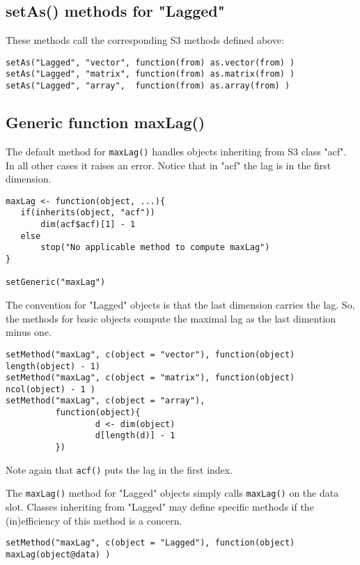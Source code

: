 \documentclass[11pt,a4paper]{article}
\begin{document}
\subsection{setAs() methods for "Lagged"}
\label{sec:orgd96946a}

These methods call the corresponding S3 methods defined above:
\begin{verbatim}
setAs("Lagged", "vector", function(from) as.vector(from) )
setAs("Lagged", "matrix", function(from) as.matrix(from) )
setAs("Lagged", "array",  function(from) as.array(from) )
\end{verbatim}



\subsection{Generic function maxLag()}
\label{sec:org888f20a}

The default method for \texttt{maxLag()} handles objects inheriting from S3 class "acf". In all
other cases it raises an error. Notice that in "acf" the lag is in the first dimension.
\begin{verbatim}
maxLag <- function(object, ...){
   if(inherits(object, "acf"))
       dim(acf$acf)[1] - 1
   else
       stop("No applicable method to compute maxLag")
}

setGeneric("maxLag")
\end{verbatim}

The convention for "Lagged" objects is that the last dimension carries the lag.  So, the
methods for basic objects compute the maximal lag as the last dimention minus one.
\begin{verbatim}
setMethod("maxLag", c(object = "vector"), function(object) length(object) - 1)
setMethod("maxLag", c(object = "matrix"), function(object) ncol(object) - 1 )
setMethod("maxLag", c(object = "array"),
          function(object){
                  d <- dim(object)
                  d[length(d)] - 1
          })
\end{verbatim}
Note again that \texttt{acf()} puts the lag in the first index.

The \texttt{maxLag()} method for "Lagged" objects simply calls \texttt{maxLag()} on the data slot. Classes
inheriting from "Lagged" may define specific methods if the (in)efficiency of this method is
a concern.
\begin{verbatim}
setMethod("maxLag", c(object = "Lagged"), function(object) maxLag(object@data) )
\end{verbatim}
\end{document}
